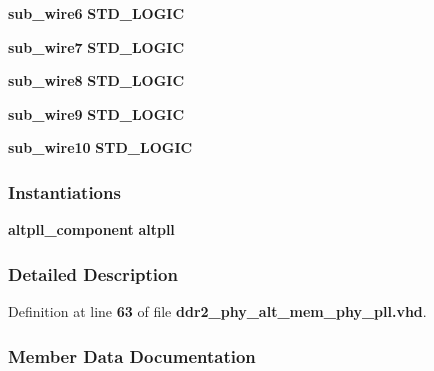 \begin{DoxyCompactItemize}
{\bf sub\+\_\+wire6} {\bfseries \textcolor{comment}{S\+T\+D\+\_\+\+L\+O\+G\+IC}\textcolor{vhdlchar}{ }} 
\item 
{\bf sub\+\_\+wire7} {\bfseries \textcolor{comment}{S\+T\+D\+\_\+\+L\+O\+G\+IC}\textcolor{vhdlchar}{ }} 
\item 
{\bf sub\+\_\+wire8} {\bfseries \textcolor{comment}{S\+T\+D\+\_\+\+L\+O\+G\+IC}\textcolor{vhdlchar}{ }} 
\item 
{\bf sub\+\_\+wire9} {\bfseries \textcolor{comment}{S\+T\+D\+\_\+\+L\+O\+G\+IC}\textcolor{vhdlchar}{ }} 
\item 
{\bf sub\+\_\+wire10} {\bfseries \textcolor{comment}{S\+T\+D\+\_\+\+L\+O\+G\+IC}\textcolor{vhdlchar}{ }} 
\end{DoxyCompactItemize}
\subsubsection*{Instantiations}
 \begin{DoxyCompactItemize}
\item 
{\bf altpll\+\_\+component}  {\bfseries altpll}   
\end{DoxyCompactItemize}


\subsubsection{Detailed Description}


Definition at line {\bf 63} of file {\bf ddr2\+\_\+phy\+\_\+alt\+\_\+mem\+\_\+phy\+\_\+pll.\+vhd}.



\subsubsection{Member Data Documentation}
\paragraph[{altpll}]{ {\bfseries \textcolor{vhdlchar}{ }} \hspace{0.3cm}{\ttfamily [Component]}}\label{classddr2__phy__alt__mem__phy__pll_1_1SYN_ad45c11bbc2e898d68e19fa2eb5ba73d5}


